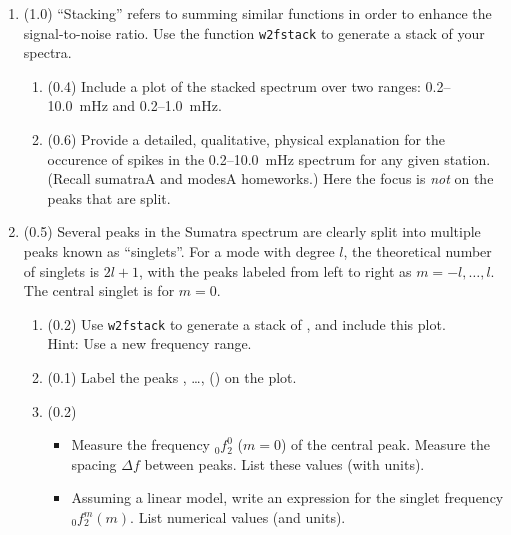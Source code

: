 \documentclass[11pt,titlepage,fleqn]{article}
\begin{document}
\begin{enumerate}
\begin{enumerate}
\item (0.2) Extract the amplitude of the  peak for all your stations. \\
List the median amplitude value (not the frequency).
\end{enumerate}


\item (1.0) ``Stacking'' refers to summing similar functions in order to enhance the signal-to-noise ratio. Use the function \verb+w2fstack+ to generate a stack of your spectra.
%
\begin{enumerate}
\item (0.4) Include a plot of the stacked spectrum over two ranges: 0.2--10.0~mHz and 0.2--1.0~mHz.
\item (0.6) Provide a detailed, qualitative, physical explanation for the occurence of spikes in the 0.2--10.0~mHz spectrum for any given station. (Recall sumatraA and modesA homeworks.) Here the focus is {\em not} on the peaks that are split.
\end{enumerate}
%


\item (0.5) Several peaks in the Sumatra spectrum are clearly split into multiple peaks known as ``singlets''. For a mode with degree $l$, the theoretical number of singlets is $2l+1$, with the peaks labeled from left to right as $m = -l,\ldots,l$. The central singlet is for $m=0$.
%
\begin{enumerate}
\item (0.2) Use \verb+w2fstack+ to generate a stack of , and include this plot. \\
Hint: Use a new frequency range.
\item (0.1) Label the peaks , \ldots,  () on the plot.
\item (0.2) 
\begin{itemize}
\item Measure the frequency $_0f_2^0$ ($m=0$) of the central peak. Measure the spacing $\Delta f$ between peaks. List these values (with units).
\item Assuming a linear model, write an expression for the singlet frequency $_0f_2^m(m)$. List numerical values (and units).
\end{itemize}
\end{enumerate}


\end{enumerate}
\end{document}
